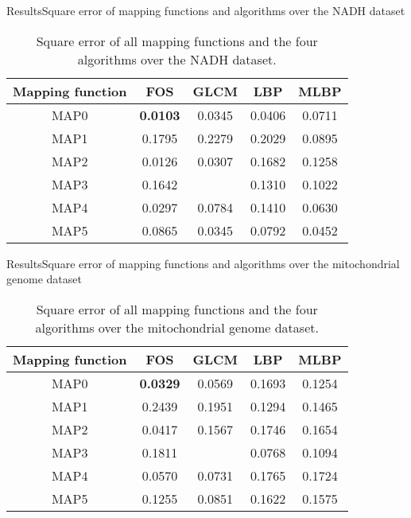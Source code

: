 \documentclass[10pt]{beamer}
\newcommand{\1}{
	\setbeamertemplate{background}{
		\texttt{[image: img/1]}
		\tikz[overlay] \fill[fill opacity=0.75,fill=white] (0,0) rectangle (-\paperwidth,\paperheight);
	}
}
\begin{document}
\begin{frame}{Results}{Square error of mapping functions and algorithms over the NADH dataset}
\begin{table}[hbt!]
	\centering
	\caption{Square error of all mapping functions and the four algorithms over the NADH dataset.}
	\label{tab:comparison_score_db2}
	\setlength{\tabcolsep}{0.5em} %
	{\renewcommand{\arraystretch}{1}%
		\begin{tabular}{ccccc}
			\hline
			Mapping function    & FOS  		& GLCM & LBP & MLBP \\ \hline
			MAP0 				&	\textbf{0.0103} &	0.0345 &	0.0406 	& 0.0711 
			\\
			MAP1 				& 	0.1795 &	0.2279 &	0.2029 &	0.0895 
			\\
			MAP2 				&	0.0126 &	0.0307 &	0.1682 &	0.1258 
			\\
			MAP3 				&	0.1642 &			& 	0.1310 &	0.1022 
			\\
			MAP4 				&	0.0297 &	0.0784 &	0.1410 &	0.0630 
			\\
			MAP5 				&	0.0865 &	0.0345 &	0.0792 &	0.0452 \\ \hline
		\end{tabular}
	}
\end{table}
\end{frame}

\begin{frame}{Results}{Square error of mapping functions and algorithms over the mitochondrial genome dataset}
\begin{table}[hbt!]
	\centering
	\caption{Square error of all mapping functions and the four algorithms over the mitochondrial genome dataset.}
	\label{tab:comparison_score_db3}
	\setlength{\tabcolsep}{0.5em} %
	{\renewcommand{\arraystretch}{1}%
		\begin{tabular}{ccccc}
			\hline
			Mapping function    & FOS  		& GLCM & LBP & MLBP \\ \hline
			MAP0 &	\textbf{0.0329} &	0.0569 &	0.1693 &	0.1254 
			\\
			MAP1 &	0.2439 &	0.1951 &	0.1294 &	0.1465 
			\\
			MAP2 &	0.0417 &	0.1567 &	0.1746 &	0.1654 
			\\
			MAP3 &	0.1811 & &		0.0768 &	0.1094 
			\\
			MAP4 &	0.0570 &	0.0731 &	0.1765 &	0.1724 
			\\
			MAP5 &	0.1255 &	0.0851 &	0.1622 & 	0.1575 
			\\ \hline
			
		\end{tabular}
	}
\end{table}
\end{frame}
\end{document}
